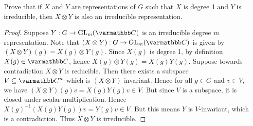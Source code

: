 \begin{exercise}
	
\end{exercise}

\begin{exercise}
	
\end{exercise}

\begin{exercise}
	Prove that if $X$ and $Y$ are representations of $G$ such that $X$ is degree 1 and $Y$ is irreducible, then $X \otimes Y$ is also an irreducible representation.
\end{exercise}
	\begin{proof}
		Suppose $Y:G \rightarrow \GL_m(\bfC)$ is an irreducible degree $m$ representation. Note that $(X \otimes Y):G \rightarrow \GL_m(\bfC)$ is given by $(X \otimes Y)(g) = X(g) \otimes Y(g)$. Since $X(g)$ is degree 1, by definition $X(g) \in \bfC$, hence $X(g) \otimes Y(g) = X(g)Y(g)$. Suppose towards contradiction $X \otimes Y$ is reducible. Then there exists a subspace $V \subseteq \bfC^n$ which is $(X \otimes Y)$-invariant. Hence for all $g \in G$ and $v \in V$, we have $(X \otimes Y)(g) v = X(g)Y(g)v \in V$. But since $V$ is a subspace, it is closed under scalar multiplication. Hence $X(g)^{-1} (X(g)Y(g))v = Y(g)v \in V$. But this means $Y$ is $V$-invariant, which is a contradiction. Thus $X \otimes Y$ is irreducible.
	\end{proof}

